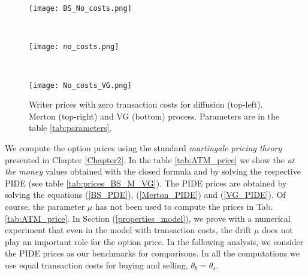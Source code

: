 \begin{figure}[t!]
 \begin{minipage}[b]{0.5\linewidth}
   \centering
   \texttt{[image: BS\_No\_costs.png]}
 \end{minipage}
 \ \hspace{2mm} \hspace{3mm} \
 \begin{minipage}[b]{0.5\linewidth}
  \centering
   \texttt{[image: no\_costs.png]}
 \end{minipage}
  \ \hspace{2mm} \hspace{3mm} \
  \begin{minipage}[b]{\linewidth}
  \centering
   \texttt{[image: No\_costs\_VG.png]}
   \caption{Writer prices with zero transaction costs for diffusion (top-left), Merton (top-right) and VG (bottom) process. Parameters are in the table \ref{tab:parameters}.}
   \label{Fig1}
 \end{minipage}
\end{figure}
We compute the option prices using the standard 
\emph{martingale pricing theory} presented in Chapter \ref{Chapter2}. In the table \ref{tab:ATM_price} we show the \emph{at the money} values obtained with the closed formula 
and by solving the respective PIDE (see table \ref{tab:prices_BS_M_VG}). 
The PIDE prices are obtained by solving the equations (\ref{BS_PDE}), (\ref{Merton_PIDE}) and (\ref{VG_PIDE}).
Of course, the parameter $\mu$ has not been used to compute the prices in Tab. \ref{tab:ATM_price}. 
In Section (\ref{properties_model}), we prove with a numerical experiment that
even in the model with transaction costs, the drift $\mu$ does not play an important role for the option price.
In the following analysis, we consider the PIDE prices as our benchmarks for comparisons.   
In all the computations we use equal transaction costs for buying and selling, $\theta_b = \theta_s$.



